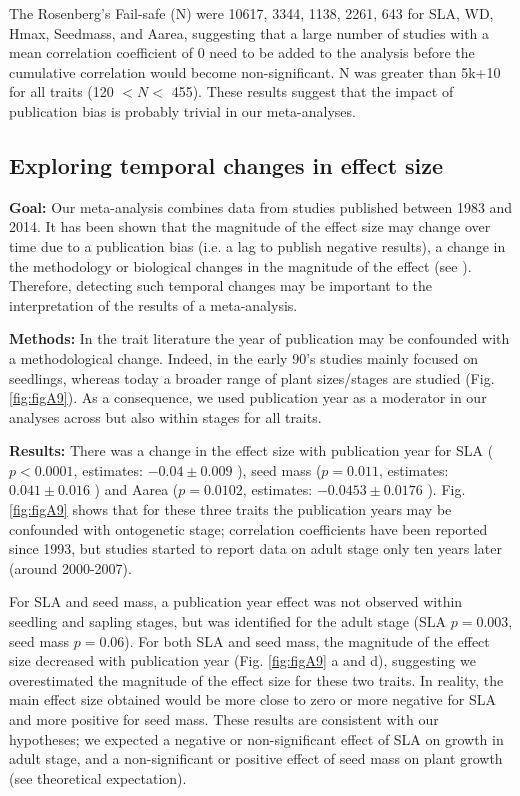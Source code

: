 \documentclass[10pt,twoside]{article}\usepackage[]{graphicx}\usepackage[]{color}
\begin{document}
The Rosenberg's Fail-safe (N) were 10617, 3344, 1138, 2261, 643 for SLA, WD, Hmax, Seedmass, and Aarea, suggesting that a large number of studies with a mean correlation coefficient of 0 need to be added to the analysis before the cumulative correlation would become non-significant. N was greater than 5k+10 for all traits (120 $< N <$ 455).
These results suggest that the impact of publication bias is probably trivial in our meta-analyses.

\clearpage
\subsection{Exploring temporal changes in effect size}
\noindent\textbf{Goal:} Our meta-analysis combines data from studies published between 1983 and 2014. It has been shown that the magnitude of the effect size may change over time due to a publication bias (i.e. a lag to publish negative results), a change in the methodology or biological changes in the magnitude of the effect (see \citealt{Koricheva:2013hy}). Therefore, detecting such temporal changes may be important to the interpretation of the results of a meta-analysis.

\noindent\textbf{Methods:} In the trait literature the year of publication may be confounded with a methodological change. Indeed, in the early 90's studies mainly focused on seedlings, whereas today a broader range of plant sizes/stages are studied (Fig. \ref{fig:figA9}). As a consequence, we used publication year as a moderator in our analyses \citep{Zvereva:2008jm} across but also within stages for all traits.

\noindent\textbf{Results:} There was a change in the effect size with publication year for SLA ($p<0.0001$, estimates: $-0.04 \pm 0.009$ ), seed mass ($p = 0.011$, estimates: $0.041 \pm 0.016$ ) and Aarea ($p = 0.0102$, estimates: $-0.0453 \pm 0.0176$ ). Fig. \ref{fig:figA9} shows that for these three traits the publication years may be confounded with ontogenetic stage; correlation coefficients have been reported since 1993, but studies started to report data on adult stage only ten years later (around 2000-2007).

For SLA and seed mass, a publication year effect was not observed within seedling and sapling stages, but was identified for the adult stage (SLA $p = 0.003$, seed mass $p = 0.06$). For both SLA and seed mass, the magnitude of the effect size decreased with publication year (Fig. \ref{fig:figA9} a and d), suggesting we overestimated the magnitude of the effect size for these two traits. In reality, the main effect size obtained would be more close to zero or more negative for SLA and more positive for seed mass. These results are consistent with our hypotheses; we expected a negative or non-significant effect of SLA on growth in adult stage, and a non-significant or positive effect of seed mass on plant growth (see theoretical expectation).
\end{document}
